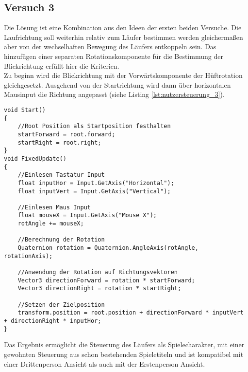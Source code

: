 \subsection{Versuch 3}
Die Lösung ist eine Kombination aus den Ideen der ersten beiden Versuche. Die Laufrichtung soll weiterhin relativ zum Läufer bestimmen werden gleichermaßen aber von der wechselhaften Bewegung des Läufers entkoppeln sein.
Das hinzufügen einer separaten Rotationskomponente für die Bestimmung der Blickrichtung erfüllt hier die Kriterien. \\
Zu beginn wird die Blickrichtung mit der Vorwärtskomponente der Hüftrotation gleichgesetzt. Ausgehend von der Startrichtung wird dann über horizontalen Mausinput die Richtung angepasst (siehe Listing \ref{lst:nutzersteuerung_3}).
\begin{lstlisting}[caption={Erweiterung der Nutzersteuerung mit separater Blickrichtung},captionpos=b,label={lst:nutzersteuerung_3}]
void Start()
{
    //Root Position als Startposition festhalten
    startForward = root.forward;
    startRight = root.right;
}
void FixedUpdate()
{
    //Einlesen Tastatur Input
    float inputHor = Input.GetAxis("Horizontal");
    float inputVert = Input.GetAxis("Vertical");

    //Einlesen Maus Input
    float mouseX = Input.GetAxis("Mouse X");
    rotAngle += mouseX;

    //Berechnung der Rotation
    Quaternion rotation = Quaternion.AngleAxis(rotAngle, rotationAxis);

    //Anwendung der Rotation auf Richtungsvektoren
    Vector3 directionForward = rotation * startForward;
    Vector3 directionRight = rotation * startRight;

    //Setzen der Zielposition
    transform.position = root.position + directionForward * inputVert + directionRight * inputHor;
}
\end{lstlisting}
Das Ergebnis ermöglicht die Steuerung des Läufers als Spielecharakter, mit einer gewohnten Steuerung aus schon bestehenden Spieletiteln und ist kompatibel mit einer Drittenperson Ansicht als auch mit der Erstenperson Ansicht.